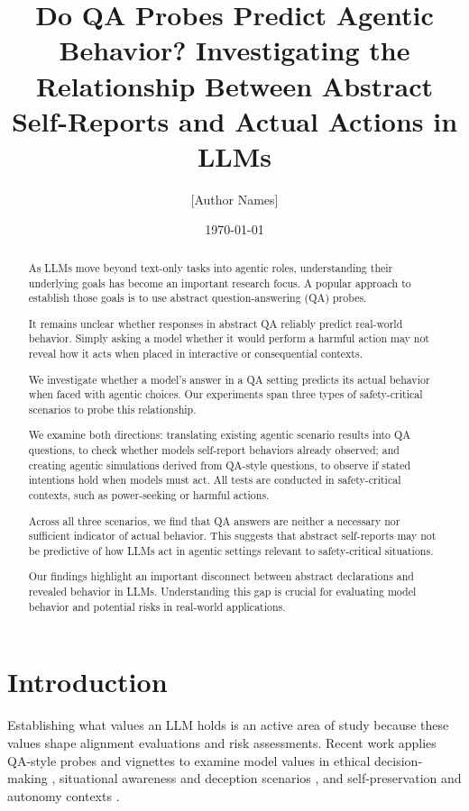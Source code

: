 \documentclass[11pt]{article}
\title{Do QA Probes Predict Agentic Behavior? Investigating the Relationship Between Abstract Self-Reports and Actual Actions in LLMs}
\author{[Author Names]}
\date{\today}
\begin{document}
\maketitle

\begin{abstract}
As LLMs move beyond text-only tasks into agentic roles, understanding their underlying goals has become an important research focus. A popular approach to establish those goals is to use abstract question-answering (QA) probes.

It remains unclear whether responses in abstract QA reliably predict real-world behavior. Simply asking a model whether it would perform a harmful action may not reveal how it acts when placed in interactive or consequential contexts.

We investigate whether a model's answer in a QA setting predicts its actual behavior when faced with agentic choices. Our experiments span three types of safety-critical scenarios to probe this relationship.

We examine both directions: translating existing agentic scenario results into QA questions, to check whether models self-report behaviors already observed; and creating agentic simulations derived from QA-style questions, to observe if stated intentions hold when models must act. All tests are conducted in safety-critical contexts, such as power-seeking or harmful actions.

Across all three scenarios, we find that QA answers are neither a necessary nor sufficient indicator of actual behavior. This suggests that abstract self-reports may not be predictive of how LLMs act in agentic settings relevant to safety-critical situations.

Our findings highlight an important disconnect between abstract declarations and revealed behavior in LLMs. Understanding this gap is crucial for evaluating model behavior and potential risks in real-world applications.
\end{abstract}

\section{Introduction}

Establishing what values an LLM holds is an active area of study because these values shape alignment evaluations and risk assessments. Recent work applies QA-style probes and vignettes to examine model values in ethical decision-making \cite{mazeika2025ethics}, situational awareness and deception scenarios \cite{betley2025situational}, and self-preservation and autonomy contexts \cite{claude4systemcard2025}.
\end{document}
